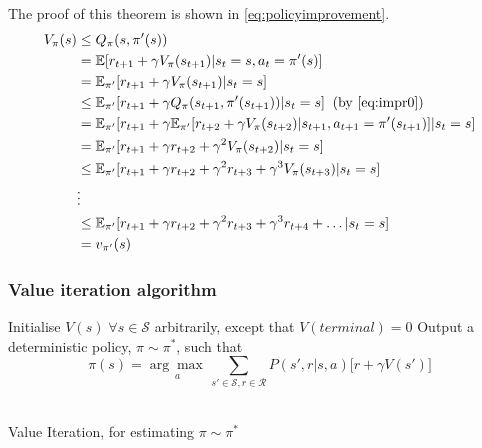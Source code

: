 The proof of this theorem is shown in \vref{eq:policyimprovement}.
\begin{align}\label{eq:policyimprovement}
\begin{split}
V_\pi(s) &\le Q_\pi(s, \pi'(s))\\
		&= \mathbb{E}[r_{t+1} + \gamma V_\pi(s_{t+1})| s_t = s, a_t = \pi'(s)]\\
		&= \mathbb{E}_{\pi'}[r_{t+1} + \gamma V_\pi(s_{t+1})| s_t = s]\\
		&\le \mathbb{E}_{\pi'}[r_{t+1} + \gamma Q_\pi(s_{t+1}, \pi'(s_{t+1}))| s_t = s] \; \; \text{(by \ref{eq:impr0})}\\
		&= \mathbb{E}_{\pi'}[r_{t+1} + \gamma \mathbb{E}_{\pi'}[r_{t+2}+ \gamma V_\pi(s_{t+2})| s_{t+1}, a_{t+1} = \pi'(s_{t+1})]| s_t = s]\\
		&= \mathbb{E}_{\pi'}[r_{t+1} + \gamma r_{t+2} + \gamma^2 V_\pi(s_{t+2})| s_t = s]\\
		&\le \mathbb{E}_{\pi'}[r_{t+1} + \gamma r_{t+2} + \gamma^2 r_{t+3} + \gamma^3 V_\pi(s_{t+3})| s_t = s]\\
		&\vdots\\
		&\le \mathbb{E}_{\pi'}[r_{t+1} + \gamma r_{t+2} + \gamma^2 r_{t+3} + \gamma^3 r_{t+4} + \dots| s_t = s]\\
		&= v_{\pi'}(s)
\end{split}
\end{align}

\subsubsection{Value iteration algorithm}

\begin{algorithm}[!htp]
	\SetAlgoLined
	\DontPrintSemicolon
	\LinesNumbered
	Initialise $V(s) \; \forall s \in \mathcal{S}$ arbitrarily, except that $V(terminal) = 0$\;
	Output a deterministic policy, $\pi \sim \pi^*$, such that \[
	\pi(s) = \underset{a}{\arg\max\,} \sum_{s' \in \mathcal{S}, r \in \mathcal{R}} P(s', r|s,a) \big[r+\gamma V(s')\big]\]\\
	\caption{Value Iteration, for estimating $\pi \sim \pi^*$}
	\label{value_iteration}
\end{algorithm}


